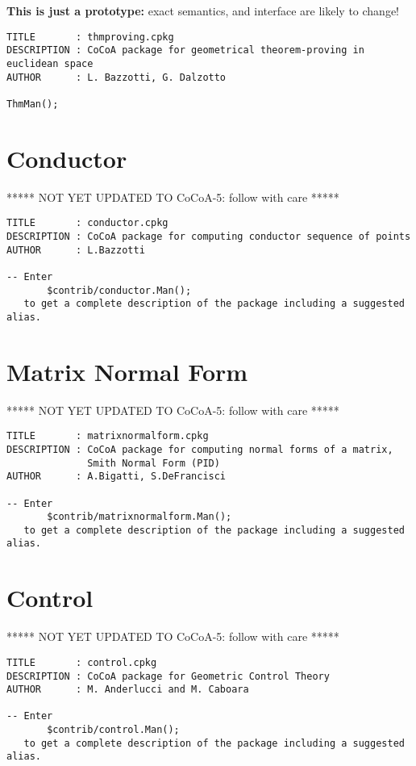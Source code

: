 \documentclass[a4paper]{mybook}
\begin{document}
        
\textbf{This is just a prototype:} exact semantics, and interface are likely to change!
\begin{verbatim}
TITLE       : thmproving.cpkg
DESCRIPTION : CoCoA package for geometrical theorem-proving in euclidean space
AUTHOR      : L. Bazzotti, G. Dalzotto

ThmMan();
\end{verbatim}


\section{Conductor}
\label{Conductor}

        
***** NOT YET UPDATED TO CoCoA-5: follow with care *****
\par 
\begin{verbatim}
TITLE       : conductor.cpkg
DESCRIPTION : CoCoA package for computing conductor sequence of points
AUTHOR      : L.Bazzotti

-- Enter
       $contrib/conductor.Man();
   to get a complete description of the package including a suggested alias.
\end{verbatim}


\section{Matrix Normal Form}
\label{Matrix Normal Form}

        
***** NOT YET UPDATED TO CoCoA-5: follow with care *****
\par 
\begin{verbatim}
TITLE       : matrixnormalform.cpkg
DESCRIPTION : CoCoA package for computing normal forms of a matrix,
              Smith Normal Form (PID)
AUTHOR      : A.Bigatti, S.DeFrancisci

-- Enter
       $contrib/matrixnormalform.Man();
   to get a complete description of the package including a suggested alias.
\end{verbatim}


\section{Control}
\label{Control}

        
***** NOT YET UPDATED TO CoCoA-5: follow with care *****
\par 
\begin{verbatim}
TITLE       : control.cpkg
DESCRIPTION : CoCoA package for Geometric Control Theory
AUTHOR      : M. Anderlucci and M. Caboara

-- Enter
       $contrib/control.Man();
   to get a complete description of the package including a suggested alias.
\end{verbatim}
\end{document}
